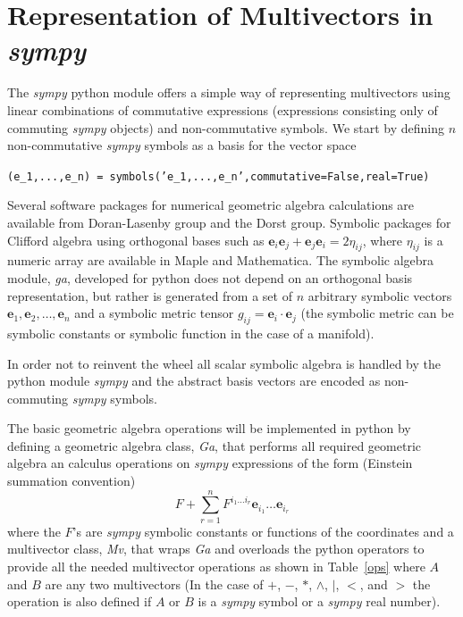 \documentclass[12pt]{report}
\newcommand{\bm}[1]{\boldsymbol{#1}}
\newcommand{\W}{\wedge}
\newcommand{\be}{\begin{equation}}
\newcommand{\ee}{\end{equation}}
\newcommand{\eb}{\bm{e}}
\newcommand{\T}[1]{\texttt{#1}}
\begin{document}
\section{Representation of Multivectors in \emph{sympy}}

The \emph{sympy} python module offers a simple way of representing multivectors using linear
combinations of commutative expressions (expressions consisting only of commuting \emph{sympy} objects)
and non-commutative symbols. We start by defining $n$ non-commutative \emph{sympy} symbols as a basis for
the vector space
\begin{center}
 \T{(e\_1,...,e\_n) = symbols('e\_1,...,e\_n',commutative=False,real=True)}
\end{center}
 

Several software packages for numerical geometric algebra calculations are
available from Doran-Lasenby group and the Dorst group. Symbolic packages for
Clifford algebra using orthogonal bases such as
$\eb_{i}\eb_{j}+\eb_{j}\eb_{i} = 2\eta_{ij}$, where $\eta_{ij}$ is a numeric
array are available in Maple and Mathematica. The symbolic algebra module,
{\em ga}, developed for python does not depend on an orthogonal basis
representation, but rather is generated from a set of $n$ arbitrary
symbolic vectors $\eb_{1},\eb_{2},\dots,\eb_{n}$ and a symbolic metric
tensor $g_{ij} = \eb_{i}\cdot \eb_{j}$ (the symbolic metric can be symbolic constants
or symbolic function in the case of a manifold).

In order not to reinvent the wheel all scalar symbolic algebra is handled by the
python module \emph{sympy} and the abstract basis vectors are encoded as
non-commuting \emph{sympy} symbols.

The basic geometric algebra operations will be implemented in python by defining
a geometric algebra class, {\em Ga}, that performs all required geometric algebra an
calculus operations on \emph{sympy} expressions of the form (Einstein summation convention)
\be
   F +\sum_{r=1}^{n}F^{i_{1}\dots i_{r}}\eb_{i_{1}}\dots\eb_{i_{r}}
\ee
where the $F$'s are \emph{sympy} symbolic constants or functions of the
coordinates and a multivector class, {\em Mv}, that wraps {\em Ga} and overloads the python operators to provide
all the needed multivector operations as shown in Table~\ref{ops}
 where $A$ and $B$  are any two multivectors (In the case of
$+$, $-$, $*$, $\W$, $|$, $<$, and $>$ the operation is also defined if $A$ or
$B$ is a \emph{sympy} symbol or a \emph{sympy} real number).
\end{document}
